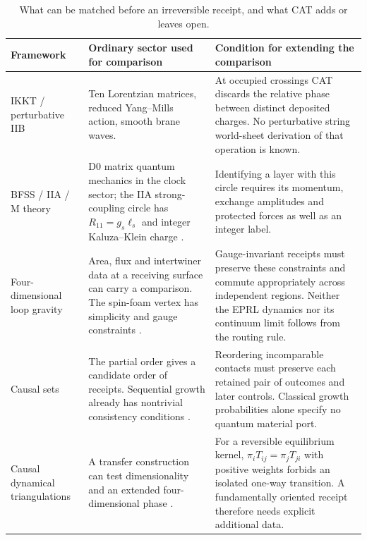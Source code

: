 \begin{table}[!tb]
\centering\small
\caption{What can be matched before an irreversible receipt, and what CAT adds or leaves open.}\label{tab:parents}
\begin{tabularx}{\linewidth}{@{}L{.22\linewidth}X X@{}}\toprule
Framework & Ordinary sector used for comparison & Condition for extending the comparison\\\midrule
IKKT / perturbative IIB & Ten Lorentzian matrices, reduced Yang--Mills action, smooth brane waves. & At occupied crossings CAT discards the relative phase between distinct deposited charges. No perturbative string world-sheet derivation of that operation is known.\\
BFSS / IIA / M theory & D0 matrix quantum mechanics in the clock sector; the IIA strong-coupling circle has \(R_{11}=g_s\ell_s\) and integer Kaluza--Klein charge \cite{bfss,witten}. & Identifying a layer with this circle requires its momentum, exchange amplitudes and protected forces as well as an integer label.\\
Four-dimensional loop gravity & Area, flux and intertwiner data at a receiving surface can carry a comparison. The spin-foam vertex has simplicity and gauge constraints \cite{lqg}. & Gauge-invariant receipts must preserve these constraints and commute appropriately across independent regions. Neither the EPRL dynamics nor its continuum limit follows from the routing rule.\\
Causal sets & The partial order gives a candidate order of receipts. Sequential growth already has nontrivial consistency conditions \cite{causet}. & Reordering incomparable contacts must preserve each retained pair of outcomes and later controls. Classical growth probabilities alone specify no quantum material port.\\
Causal dynamical triangulations & A transfer construction can test dimensionality and an extended four-dimensional phase \cite{cdt}. & For a reversible equilibrium kernel, \(\pi_iT_{ij}=\pi_jT_{ji}\) with positive weights forbids an isolated one-way transition. A fundamentally oriented receipt therefore needs explicit additional data.\\
\bottomrule\end{tabularx}
\end{table}

